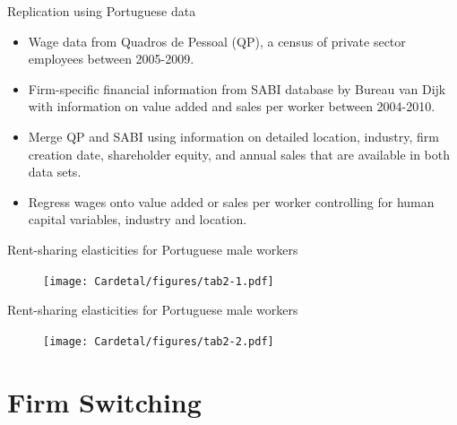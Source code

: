 \documentclass[notes=show]{beamer}
\begin{document}
\begin{frame}{Replication using Portuguese data}
\begin{itemize}
\item Wage data from Quadros de Pessoal (QP), a census of private sector employees between 2005-2009. \medskip 
\item Firm-specific financial information from SABI database by Bureau van Dijk with information on value added and sales per worker between 2004-2010. \medskip
\item Merge QP and SABI using information on detailed location, industry, firm creation date, shareholder equity, and annual sales that are available in both data sets. \medskip
\item Regress wages onto value added or sales per worker controlling for human capital variables, industry and location.
\end{itemize}
\end{frame}

\newpage
\begin{frame}{Rent-sharing elasticities for Portuguese male workers}
\begin{center}
\begin{figure}
\texttt{[image: Cardetal/figures/tab2-1.pdf]}
\end{figure} 
\end{center}
\end{frame}

\newpage
\begin{frame}{Rent-sharing elasticities for Portuguese male workers}
\begin{center}
\begin{figure}
\texttt{[image: Cardetal/figures/tab2-2.pdf]}
\end{figure} 
\end{center}
\end{frame}

\section{Firm Switching}
\end{document}
